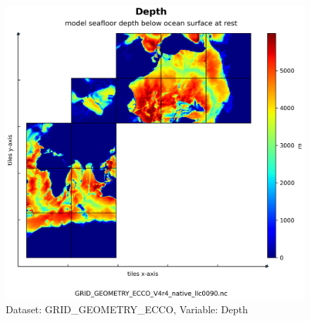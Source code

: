 \begin{figure}[H]
\centering
\includegraphics[scale=0.55]{../images/plots/native_plots_coords/Geometry_Parameters_for_the_Lat-Lon-Cap_90_(llc90)_Native_Model_Grid_(Version_4_Release_4)/Depth.png}
\caption{Dataset: GRID\_GEOMETRY\_ECCO, Variable: Depth}
\label{tab:table-GRID_GEOMETRY_ECCO_Depth-Plot}
\end{figure}
\pagebreak
